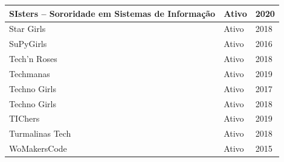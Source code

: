 \begin{longtable}{|l|l|l|}
SIsters – Sororidade em Sistemas de Informação                                                                                                              & Ativo                        & 2020                        \\ \hline
Star Girls                                                                                                                                                  & Ativo                        & 2018                        \\ \hline
SuPyGirls                                                                                                                                                   & Ativo                        & 2016                        \\ \hline
Tech’n Roses                                                                                                                                                & Ativo                        & 2018                        \\ \hline
  
Techmanas                                                                                                                                                   & Ativo                        & 2019                        \\ \hline
Techno Girls                                                                                                                                                & Ativo                        & 2017                        \\ \hline
  
Techno Girls                                                                                                                                                & Ativo                        & 2018                        \\ \hline
  
TIChers                                                                                                                                                     & Ativo                        & 2019                        \\ \hline
Turmalinas Tech                                                                                                                                             & Ativo                        & 2018                        \\ \hline
  
WoMakersCode                                                                                                                                                & Ativo                        & 2015                        \\ \hline
\end{longtable}

